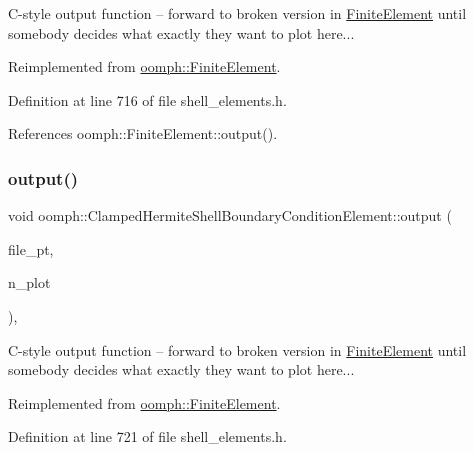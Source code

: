 C-\/style output function -- forward to broken version in \hyperlink{classoomph_1_1FiniteElement}{Finite\+Element} until somebody decides what exactly they want to plot here... 

Reimplemented from \hyperlink{classoomph_1_1FiniteElement_a72cddd09f8ddbee1a20a1ff404c6943e}{oomph\+::\+Finite\+Element}.



Definition at line 716 of file shell\+\_\+elements.\+h.



References oomph\+::\+Finite\+Element\+::output().

\mbox{\label{classoomph_1_1ClampedHermiteShellBoundaryConditionElement_ade7c773aa9f4587d25945b4f4860a690}} 
\subsubsection{\texorpdfstring{output()}{output()}\hspace{0.1cm}{\footnotesize\ttfamily [4/4]}}
{\footnotesize\ttfamily void oomph\+::\+Clamped\+Hermite\+Shell\+Boundary\+Condition\+Element\+::output (\begin{DoxyParamCaption}\item[{F\+I\+LE $\ast$}]{file\+\_\+pt,  }\item[{const unsigned \&}]{n\+\_\+plot }\end{DoxyParamCaption})\hspace{0.3cm}{\ttfamily [inline]}, {\ttfamily [virtual]}}



C-\/style output function -- forward to broken version in \hyperlink{classoomph_1_1FiniteElement}{Finite\+Element} until somebody decides what exactly they want to plot here... 



Reimplemented from \hyperlink{classoomph_1_1FiniteElement_adfaee690bb0608f03320eeb9d110d48c}{oomph\+::\+Finite\+Element}.



Definition at line 721 of file shell\+\_\+elements.\+h.



